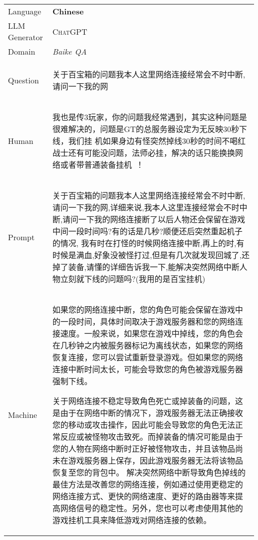 \begin{center}
\begin{supertabular}{l | p{12cm}}
        Language &  \textbf{Chinese} \\
        LLM Generator & \textsc{ChatGPT} \\
        Domain &  \textit{Baike QA} \\
        \midrule
        Question & \begin{CJK}{UTF8}{gbsn}关于百宝箱的问题我本人这里网络连接经常会不时中断,请问一下我的网\end{CJK} \\
        \midrule
        Human & \begin{CJK}{UTF8}{gbsn}我也是传3玩家，你的问题我经常遇到，其实这种问题是很难解决的，问题是GT的总服务器设定为无反映30秒下线，我们挂 机如果身边有怪突然掉线30秒的时间不喝红战士还有可能没问题，法师必挂，解决的话只能换换网络或者带普通装备挂机~！\end{CJK}\\ 
        \midrule
        Prompt & \begin{CJK}{UTF8}{gbsn}关于百宝箱的问题我本人这里网络连接经常会不时中断,请问一下我的网,详细来说,我本人这里连接经常会不时中断,请问一下我的网络连接断了以后人物还会保留在游戏中间一段时间吗?有的话是几秒?顺便还后突然重起机子的情况, 我有时在打怪的时候网络连接中断,再上的时,有时候是满血,好象没被怪打过,但是有几次就发现回城了,还掉了装备,请懂的详细告诉我一下,能解决突然网络中断人物立刻就下线的问题吗?(我用的是百宝挂机)\end{CJK}\\
        \midrule
        Machine & \begin{CJK}{UTF8}{gbsn}如果您的网络连接中断，您的角色可能会保留在游戏中的一段时间，具体时间取决于游戏服务器和您的网络连接速度。一般来说，如果您在游戏中掉线，您的角色会在几秒钟之内被服务器标记为离线状态，如果您的网络恢复连接，您可以尝试重新登录游戏。但如果您的网络连接中断时间太长，可能会导致您的角色被游戏服务器强制下线。\end{CJK}
        \begin{CJK}{UTF8}{gbsn}关于网络连接不稳定导致角色死亡或掉装备的问题，这是由于在网络中断的情况下，游戏服务器无法正确接收您的移动或攻击操作，因此可能会导致您的角色无法正常反应或被怪物攻击致死。而掉装备的情况可能是由于您的人物在网络中断时正好被怪物攻击，并且该物品尚未在游戏服务器上保存，因此游戏服务器无法将该物品恢复至您的背包中。
        解决突然网络中断导致角色掉线的最佳方法是改善您的网络连接，例如通过使用更稳定的网络连接方式、更快的网络速度、更好的路由器等来提高网络信号的稳定性。另外，您也可以考虑使用其他的游戏挂机工具来降低游戏对网络连接的依赖。\end{CJK}\\		
	\end{supertabular}
\end{center}